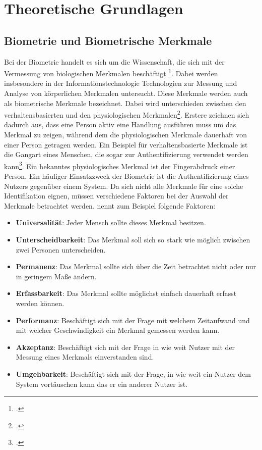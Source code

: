 \section{Theoretische Grundlagen}
\subsection{Biometrie und Biometrische Merkmale}
Bei der Biometrie handelt es sich um die Wissenschaft, die sich mit der Vermessung von biologischen Merkmalen beschäftigt \footcite[Vgl.][]{Sea18}. Dabei werden insbesondere in der Informationstechnologie Technologien zur Messung und Analyse von körperlichen Merkmalen untersucht.\newline
Diese Merkmale werden auch als biometrische Merkmale bezeichnet. Dabei wird unterschieden zwischen den verhaltensbasierten und den physiologischen Merkmalen\footcite[Vgl. ][]{Sas06}. Erstere zeichnen sich dadurch aus, dass eine Person aktiv eine Handlung ausführen muss um das Merkmal zu zeigen, während dem die physiologischen Merkmale dauerhaft von einer Person getragen werden. Ein Beispiel für verhaltensbasierte Merkmale ist die Gangart eines Menschen, die sogar zur Authentifizierung verwendet werden kann\footcite[Vgl. ][]{Cla09}. Ein bekanntes physiologisches Merkmal ist der Fingerabdruck einer Person.\newline
Ein häufiger Einsatzzweck der Biometrie ist die Authentifizierung eines Nutzers gegenüber einem System. Da sich nicht alle Merkmale für eine solche Identifikation eignen, müssen verschiedene Faktoren bei der Auswahl der Merkmale betrachtet werden. \cite{Akj04} nennt zum Beispiel folgende Faktoren: 
\begin{itemize}
	\item \textbf{Universalität}: Jeder Mensch sollte dieses Merkmal besitzen.
	\item \textbf{Unterscheidbarkeit}: Das Merkmal soll sich so stark wie möglich zwischen zwei Personen unterscheiden.
	\item \textbf{Permanenz}: Das Merkmal sollte sich über die Zeit betrachtet nicht oder nur in geringem Maße ändern.
	\item \textbf{Erfassbarkeit}: Das Merkmal sollte möglichst einfach dauerhaft erfasst werden können.
	\item \textbf{Performanz}: Beschäftigt sich mit der Frage mit welchem Zeitaufwand und mit welcher Geschwindigkeit ein Merkmal gemessen werden kann. 
	\item \textbf{Akzeptanz}: Beschäftigt sich mit der Frage in wie weit Nutzer mit der Messung eines Merkmals einverstanden sind. 
	\item \textbf{Umgehbarkeit}: Beschäftigt sich mit der Frage, in wie weit ein Nutzer dem System vortäuschen kann das er ein anderer Nutzer ist.
\end{itemize}
